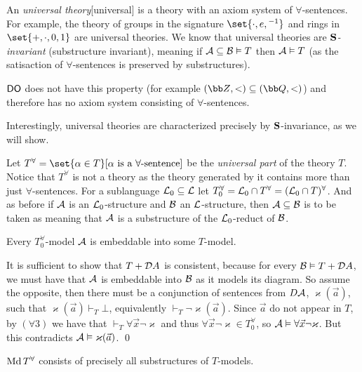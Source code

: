 An {\it universal theory}[universal] is a theory with an axiom system of $\forall$-sentences.
For example, the theory of groups in the signature $\set{\cdot,e,{}^{-1}}$ and rings in $\set{+,\cdot,0,1}$ are universal theories.
We know that universal theories are {\it ${\bf S}$-invariant} (substructure invariant), meaning if ${\cal A}\subseteq{\cal B}\vDash T$ then ${\cal A}\vDash T$ (as the satisaction
of $\forall$-sentences is preserved by substructures).

${\sf DO}$ does not have this property (for example $({\bb Z},<)\subseteq({\bb Q},<)$) and therefore has no axiom system consisting of $\forall$-sentences.

Interestingly, universal theories are characterized precisely by ${\bf S}$-invariance, as we will show.

Let $T^\forall=\set{\alpha\in T}[\hbox{$\alpha$ is a $\forall$-sentence}]$ be the {\it universal part} of the theory $T$.
Notice that $T^\forall$ is not a theory as the theory generated by it contains more than just $\forall$-sentences.
For a sublanguage ${\cal L}_0\subseteq{\cal L}$ let $T^\forall_0={\cal L}_0\cap T^\forall=({\cal L}_0\cap T)^\forall$.
And as before if ${\cal A}$ is an ${\cal L}_0$-structure and ${\cal B}$ an ${\cal L}$-structure, then ${\cal A}\subseteq{\cal B}$ is to be taken as meaning that ${\cal A}$ is a substructure of the
${\cal L}_0$-reduct of ${\cal B}$.

\blemm[name=upartembedlemma]

    Every $T_0^\forall$-model ${\cal A}$ is embeddable into some $T$-model.

\elemm

It is sufficient to show that $T+{\cal D}A$ is consistent, because for every ${\cal B}\vDash T+{\cal D}A$, we must have that ${\cal A}$ is embeddable into ${\cal B}$ as it models its diagram.
So assume the opposite, then there must be a conjunction of sentences from $D{\cal A}$, $\varkappa(\vec a)$, such that $\varkappa(\vec a)\vdash_T\bot$, equivalently $\vdash_T\neg\varkappa(\vec a)$.
Since $\vec a$ do not appear in $T$, by $(\forall3)$ we have that $\vdash_T\forall\vec x\neg\varkappa$ and thus $\forall\vec x\neg\varkappa\in T_0^\forall$, so ${\cal A}\vDash\forall\vec x\neg\varkappa$.
But this contradicts ${\cal A}\vDash\varkappa(\vec a)$.
\qed

\blemm

    $\mathop{\rm Md} T^\forall$ consists of precisely all substructures of $T$-models.

